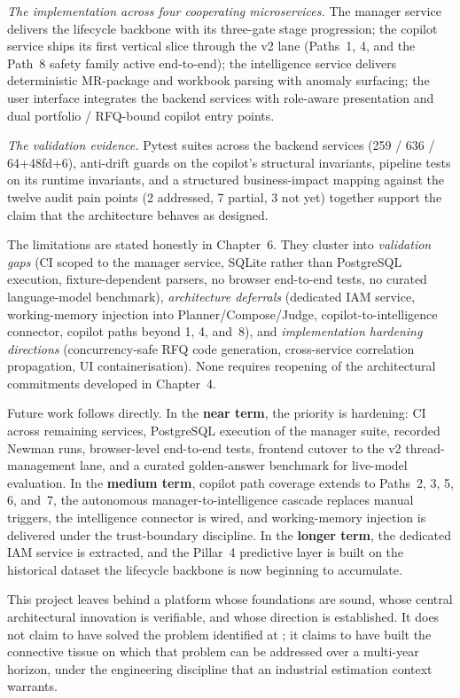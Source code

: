 \textit{The implementation across four cooperating microservices.} The manager service delivers the lifecycle backbone with its three-gate stage progression; the copilot service ships its first vertical slice through the v2 lane (Paths~1, 4, and the Path~8 safety family active end-to-end); the intelligence service delivers deterministic MR-package and workbook parsing with anomaly surfacing; the user interface integrates the backend services with role-aware presentation and dual portfolio / RFQ-bound copilot entry points.

\textit{The validation evidence.} Pytest suites across the backend services (259 / 636 / 64+48fd+6), anti-drift guards on the copilot's structural invariants, pipeline tests on its runtime invariants, and a structured business-impact mapping against the twelve audit pain points (2 addressed, 7 partial, 3 not yet) together support the claim that the architecture behaves as designed.

The limitations are stated honestly in Chapter~6. They cluster into \textit{validation gaps} (CI scoped to the manager service, SQLite rather than PostgreSQL execution, fixture-dependent parsers, no browser end-to-end tests, no curated language-model benchmark), \textit{architecture deferrals} (dedicated IAM service, working-memory injection into Planner/Compose/Judge, copilot-to-intelligence connector, copilot paths beyond 1, 4, and~8), and \textit{implementation hardening directions} (concurrency-safe RFQ code generation, cross-service correlation propagation, UI containerisation). None requires reopening of the architectural commitments developed in Chapter~4.

Future work follows directly. In the \textbf{near term}, the priority is hardening: CI across remaining services, PostgreSQL execution of the manager suite, recorded Newman runs, browser-level end-to-end tests, frontend cutover to the v2 thread-management lane, and a curated golden-answer benchmark for live-model evaluation. In the \textbf{medium term}, copilot path coverage extends to Paths~2, 3, 5, 6, and~7, the autonomous manager-to-intelligence cascade replaces manual triggers, the intelligence connector is wired, and working-memory injection is delivered under the trust-boundary discipline. In the \textbf{longer term}, the dedicated IAM service is extracted, and the Pillar~4 predictive layer is built on the historical dataset the lifecycle backbone is now beginning to accumulate.

This project leaves behind a platform whose foundations are sound, whose central architectural innovation is verifiable, and whose direction is established. It does not claim to have solved the problem identified at \clientCompany; it claims to have built the connective tissue on which that problem can be addressed over a multi-year horizon, under the engineering discipline that an industrial estimation context warrants.
